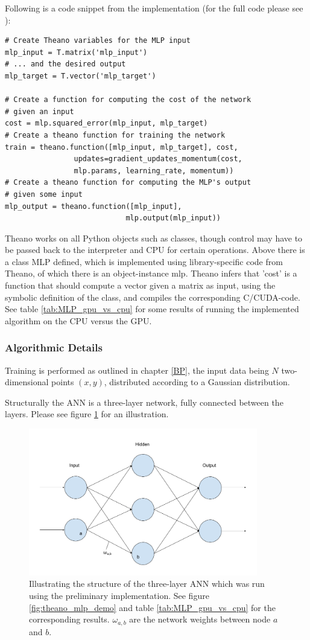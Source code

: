 Following is a code snippet from the implementation (for the full code please see \citep{Raffel2015}):

\begin{verbatim}
# Create Theano variables for the MLP input
mlp_input = T.matrix('mlp_input')
# ... and the desired output
mlp_target = T.vector('mlp_target')

# Create a function for computing the cost of the network 
# given an input
cost = mlp.squared_error(mlp_input, mlp_target)
# Create a theano function for training the network
train = theano.function([mlp_input, mlp_target], cost,
                updates=gradient_updates_momentum(cost,
                mlp.params, learning_rate, momentum))
# Create a theano function for computing the MLP's output 
# given some input
mlp_output = theano.function([mlp_input], 
                            mlp.output(mlp_input))
\end{verbatim}

Theano works on all Python objects such as classes, though control may have to be passed back to the interpreter and CPU for certain operations. Above there is a class MLP defined, which is implemented using library-specific code from Theano, of which there is an object-instance mlp. Theano infers that 'cost' is a function that should compute a vector given a matrix as input, using the symbolic definition of the class, and compiles the corresponding C/CUDA-code. See table \ref{tab:MLP_gpu_vs_cpu} for some results of running the implemented algorithm on the CPU versus the GPU.


\subsubsection{Algorithmic Details}
Training is performed as outlined in chapter \ref{BP}, the input data being $N$ two-dimensional points $(x, y)$, distributed according to a Gaussian distribution.

Structurally the ANN is a three-layer network, fully connected between the layers. Please see figure \ref{fig:MLP_demo} for an illustration.

\begin{figure}
\centering
\includegraphics[width=10cm]{fig/MLP_demo}
\caption{Illustrating the structure of the three-layer ANN which was run using the preliminary implementation. See figure \ref{fig:theano_mlp_demo} and table \ref{tab:MLP_gpu_vs_cpu} for the corresponding results. $\omega_{a,b}$ are the network weights between node $a$ and $b$.}
\label{fig:MLP_demo}
\end{figure}

